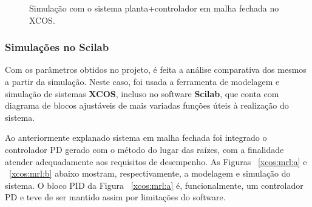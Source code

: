 \begin{figure}[H]
\begin{center}
\end{center}
\caption{Simulação com o sistema planta+controlador em malha fechada no XCOS.}
\label{xcos:rl} 
\end{figure}

\subsubsection{Simulações no Scilab}

Com os parâmetros obtidos no projeto, é feita a análise comparativa dos mesmos a partir da simulação. Neste caso, foi usada a ferramenta de modelagem e simulação de sistemas \textbf{XCOS}, incluso no software \textbf{Scilab}, que conta com diagrama de blocos ajustáveis de mais variadas funções úteis à realização do sistema.

Ao anteriormente explanado sistema em malha fechada foi integrado o controlador PD gerado com o método do lugar das raízes, com a finalidade atender adequadamente aos requisitos de desempenho. As Figuras ~\ref{xcos:mrl:a} e ~\ref{xcos:mrl:b} abaixo mostram, respectivamente, a modelagem e simulação do sistema. O bloco PID da Figura ~\ref{xcos:mrl:a} é, funcionalmente, um controlador PD e teve de ser mantido assim por limitações do software.


